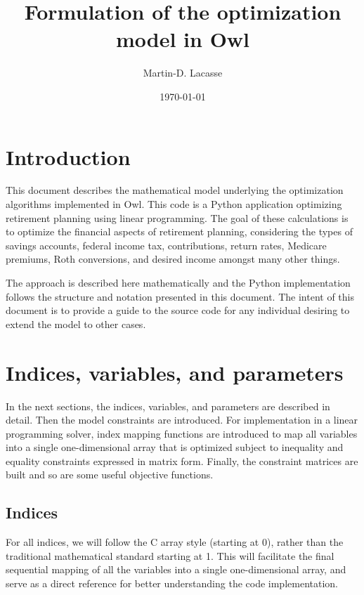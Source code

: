 \documentclass{report}[fleqn,11pt]
\begin{document}
\title{Formulation of the optimization model in Owl}
\author{Martin-D. Lacasse}
\date{\today}
\maketitle
\thispagestyle{fancy}
\fancyhead{}

\chapter{Introduction}
This document describes the mathematical model underlying
the optimization algorithms implemented in
Owl. This code is a Python application optimizing retirement
planning using linear programming. The goal of
these calculations is to optimize the financial aspects
of retirement planning, considering the types of savings accounts,
federal income tax, contributions, return rates, Medicare premiums, Roth conversions,
and desired income amongst many other things.

The approach is described here mathematically and the Python implementation
follows the structure and notation presented in this document.
The intent of this document is to provide a guide to the source code
for any individual desiring to extend the model to other cases.

\chapter{Indices, variables, and parameters}
In the next sections, the indices, variables, and parameters are
described in detail. Then the model constraints are introduced.
For implementation in a linear programming solver, index mapping
functions are introduced to map all variables into a single
one-dimensional array that
is optimized subject to inequality and equality constraints
expressed in matrix form. Finally, the constraint matrices are built
and so are some useful objective functions.

\section{Indices}
For all indices, we will follow the C array style (starting at 0),
rather than the traditional mathematical standard starting at 1.
This will facilitate the final
sequential mapping of all the variables into a single one-dimensional array,
and serve as a direct reference for better understanding the code implementation.
\end{document}
